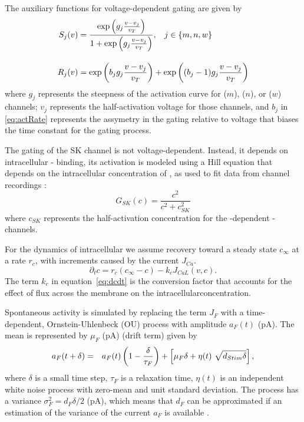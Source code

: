 \documentclass[10pt]{article}
\begin{document}
The auxiliary functions for voltage-dependent gating are given by
\begin{align}
S_j(v) &= \frac{\textrm{exp}\left(g_j \frac{v-v_j}{v_T} \right)}{1 + \textrm{exp}\left(g_j \frac{v-v_j}{v_T} \right)}, \hspace{0.3cm} j \in \left\{m,n,w\right\} 
\\[1em]
R_j(v) &= \textrm{exp} \left(b_j g_j\frac{v-v_j}{v_T}\right) + \textrm{exp} \left((b_j-1)g_j\frac{v-v_j}{v_T}\right)
\label{eq:actRate}
\end{align}
where $g_j$ represents the steepness of the activation curve for \natrium ($m$), \calcium ($n$), or \kalium ($w$) channels; $v_j$ represents the half-activation voltage for those channels, and $b_j$ in \eqref{eq:actRate} represents the assymetry in the gating relative to voltage that biases the time constant for the gating process. 

The gating of the SK channel is not voltage-dependent. Instead, it depends on intracellular \calcium- binding, its activation is modeled using a Hill equation that depends on the intracellular concentration of \calcium, as used to fit data from channel recordings \citep{hirschberg1999gating}:
\begin{equation}
G_{SK}(c) = \frac{c^2}{c^2 + c_{SK}^2}
\end{equation}
where $c_{SK}$ represents the half-activation \calcium concentration for the \calcium-dependent \kalium-channels.

For the dynamics of intracellular \calcium we assume recovery toward a steady state $c_{\infty}$ at a rate $r_c$, with increments caused by the \calcium current $J_{Ca}$.
\begin{equation}
\partial_t{c} = r_{c}({c_{\infty} - c}) - k_{c}J_{CaL}(v,c).
\label{eq:dcdt}
\end{equation}
The term $k_c$ in equation~\eqref{eq:dcdt} is the conversion factor that accounts for the effect of \calcium flux across the membrane on the intracellular\calcium concentration. 

Spontaneous activity is simulated by replacing the term $J_{F}$ with a  time-dependent, Ornstein-Uhlenbeck (OU) process with amplitude $a_{F}(t)$ (pA). The mean is represented by  $\mu_{F}$ (pA) (drift term)
\citep{rudolph2003characterization}  given by \citep{gillespie1996mathematics,
  gillespie1996exact} 
\begin{eqnarray}
{a}_{F}(t+\delta) &=& a_{F}(t) \left(1 -  \frac{\delta}{\tau_{F}}\right)  +
\left[ \mu_{F} \delta + \eta(t) ~\sqrt{d_{Stim} \delta}\right] ,
\end{eqnarray}
where $\delta$ is a small time step, $\tau_{F}$ is a relaxation time,  $\eta(t)$ is an independent
white noise process with zero-mean and unit standard deviation. The process has a variance
$\sigma_{F}^2 = d_{F} \delta /2$ (pA), which means that $d_{F}$ can be
approximated if an estimation of the variance of the current $a_{F}$ is
available \citep{rudolph2004method,destexhe2004novel}.  
\end{document}
